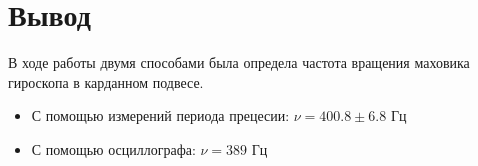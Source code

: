     \section{Вывод}
        В ходе работы двумя способами была определа частота вращения маховика гироскопа в карданном подвесе.
        \begin{itemize}
            \item С помощью измерений периода прецесии: $\nu = 400.8 \pm 6.8$ Гц
            \item С помощью осциллографа: $\nu = 389$ Гц
        \end{itemize}

